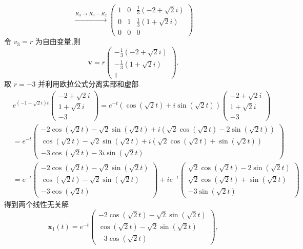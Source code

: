 \begin{questions}
\begin{solution}
\[        \]
        \[
        \xrightarrow{R_3 \to R_3 - R_2} \begin{pmatrix} 1 & 0 & \frac{1}{3}(-2+\sqrt{2}i) \\ 0 & 1 & \frac{1}{3}(1+\sqrt{2}i) \\ 0 & 0 & 0 \end{pmatrix}
        \]
        令 $v_3 = r$ 为自由变量,则
        \[
        \boldsymbol{v} = r \begin{pmatrix}-\frac{1}{3}(-2+\sqrt{2}i) \\ -\frac{1}{3}(1+\sqrt{2}i) \\ 1 \end{pmatrix}.
        \]
        取 $r=-3$ 并利用欧拉公式分离实部和虚部
        \begin{align*}
        &e^{(-1+\sqrt{2}i)t} \begin{pmatrix} -2+\sqrt{2}i \\ 1+\sqrt{2}i \\ -3 \end{pmatrix} = e^{-t}(\cos(\sqrt{2}t) + i\sin(\sqrt{2}t)) \begin{pmatrix} -2+\sqrt{2}i \\ 1+\sqrt{2}i \\ -3 \end{pmatrix} \\
        &= e^{-t} \begin{pmatrix} -2\cos(\sqrt{2}t) - \sqrt{2}\sin(\sqrt{2}t) + i(\sqrt{2}\cos(\sqrt{2}t) - 2\sin(\sqrt{2}t)) \\ \cos(\sqrt{2}t) - \sqrt{2}\sin(\sqrt{2}t) + i(\sqrt{2}\cos(\sqrt{2}t) + \sin(\sqrt{2}t)) \\ -3\cos(\sqrt{2}t) - 3i\sin(\sqrt{2}t) \end{pmatrix} \\
        &= e^{-t} \begin{pmatrix} -2\cos(\sqrt{2}t) - \sqrt{2}\sin(\sqrt{2}t) \\ \cos(\sqrt{2}t) - \sqrt{2}\sin(\sqrt{2}t) \\ -3\cos(\sqrt{2}t) \end{pmatrix} + ie^{-t} \begin{pmatrix} \sqrt{2}\cos(\sqrt{2}t) - 2\sin(\sqrt{2}t) \\ \sqrt{2}\cos(\sqrt{2}t) + \sin(\sqrt{2}t) \\ -3\sin(\sqrt{2}t) \end{pmatrix}
        \end{align*}
        得到两个线性无关解
        \[
        \boldsymbol{x}_1(t) = e^{-t} \begin{pmatrix}-2\cos(\sqrt{2}t)-\sqrt{2}\sin(\sqrt{2}t) \\ \cos(\sqrt{2}t)-\sqrt{2}\sin(\sqrt{2}t) \\ -3\cos(\sqrt{2}t) \end{pmatrix}, 
\]
\end{solution}
\end{questions}
